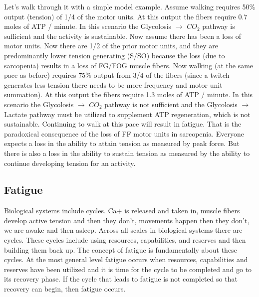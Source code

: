 Let's walk through it with a simple model example. Assume walking requires 50\% output (tension) of 1/4 of the motor units. At this output the fibers require 0.7 moles of ATP / minute. In this scenario the Glycolosis $\rightarrow$ $CO_2$ pathway is sufficient and the activity is sustainable. Now assume there has been a loss of motor units. Now there are 1/2 of the prior motor units, and they are predominantly lower tension generating (S/SO) because the loss (due to sarcopenia) results in a loss of FG/FOG muscle fibers. Now walking (at the same pace as before) requires 75\% output from 3/4 of the fibers (since a twitch generates less tension there needs to be more frequency and motor unit summation). At this output the fibers require 1.3 moles of ATP / minute. In this scenario the Glycolosis $\rightarrow$ $CO_2$ pathway is not sufficient and the Glycolosis $\rightarrow$ Lactate pathway must be utilized to supplement ATP regeneration, which is not sustainable. Continuing to walk at this pace will result in fatigue. That is the paradoxical consequence of the loss of FF motor units in sarcopenia. Everyone expects a loss in the ability to attain tension as measured by peak force. But there is also a loss in the ability to sustain tension as measured by the ability to continue developing tension for an activity.


\subsection{Fatigue}


Biological systems include cycles. Ca+ is released and taken in, muscle fibers develop active tension and then they don't, movements happen then they don't, we are awake and then asleep. Across all scales in biological systems there are cycles. These cycles include using resources, capabilities, and reserves and then building them back up. The concept of fatigue is fundamentally about these cycles. At the most general level fatigue occurs when resources, capabilities and reserves have been utilized and it is time for the cycle to be completed and go to its recovery phase. If the cycle that leads to fatigue is not completed so that recovery can begin, then fatigue occurs.

